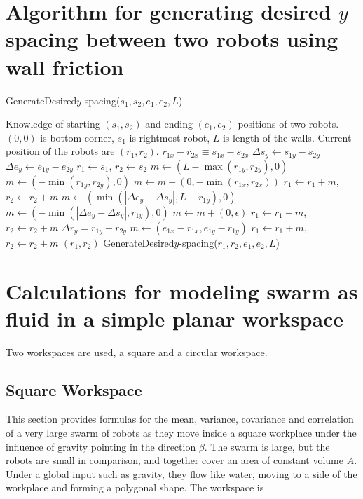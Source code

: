 \documentclass[conference]{IEEEtran}
\begin{document}
\section{ Algorithm for generating desired $y$ spacing between two robots using wall friction}\label{sec:2robotWallFriction}
\begin{algorithm}
\caption{GenerateDesired$y$-spacing($s_1,s_2,e_1,e_2,L$)}\label{alg:YControl}
\begin{algorithmic}[1]
\Require Knowledge of starting $(s_1,s_2)$ and ending $(e_1,e_2)$ positions of  two robots. 
$(0,0)$ is bottom corner, $s_1$ is rightmost robot, 
 $L$ is length of the walls. Current position of the robots are $(r_1,r_2)$.
\Ensure   $ r_{1x} - r_{2x}  \equiv s_{1x} - s_{2x} $   %
\State $ \Delta s_y  \gets s_{1y} - s_{2y} $
\State $ \Delta e_y \gets e_{1y} - e_{2y} $
\State $ r_1 \gets s_1$, $ r_2 \gets s_2$
\State $ m \gets ( L-\max( r_{1y},r_{2y}) ,0)   $ 
\Else 
\State  $ m \gets ( -\min( r_{1y},r_{2y}),0 )    $ 
\EndIf
\State $m  \gets  m + (0, -\min( r_{1x},r_{2x} ))$ 
\State $ r_1 \gets r_1+m$, $ r_2 \gets r_2+m$ 
\State $ m \gets (\min(|\Delta e_y - \Delta s_y |, L- r_{1y}), 0)$  
\Else
\State $ m \gets (-\min(|\Delta e_y - \Delta s_y |, r_{1y}), 0)$
\EndIf 
\State $m  \gets  m + (0, \epsilon)$ 
\State $ r_1 \gets r_1+m$, $ r_2 \gets r_2+m$ 
\State $\Delta r_y = r_{1y} - r_{2y}$
\State   $ m \gets (e_{1x}-r_{1x}, e_{1y}-r_{1y})$
\State $ r_1 \gets r_1+m$, $ r_2 \gets r_2+m$ 
\State  \Return $(r_1,r_2)$
\Else   
\State \Return GenerateDesired$y$-spacing($r_1,r_2,e_1,e_2,L$)
\EndIf
\end{algorithmic}
\end{algorithm}



\section{Calculations for modeling swarm as fluid in a simple planar workspace}\label{sec:fluidInPlanarRegion}
Two workspaces are used, a square and a circular workspace.

\subsection{Square Workspace}
This section provides formulas for the mean, variance,  covariance and correlation of a very large swarm of robots as they move inside a square workplace under the influence of gravity pointing in the direction $\beta$. The swarm is large, but the robots are small in comparison, and together cover an area of constant volume $A$. Under a global input such as gravity, they flow like water, moving to a side of the workplace and forming a polygonal shape. The workspace is 
\end{document}
